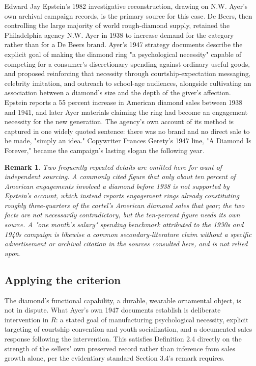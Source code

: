 \documentclass[11pt]{article}
\newtheorem{remark}[definition]{Remark}
\begin{document}
Edward Jay Epstein's 1982 investigative reconstruction, drawing on N.W. Ayer's own archival campaign records, is the primary source for this case. De Beers, then controlling the large majority of world rough-diamond supply, retained the Philadelphia agency N.W. Ayer in 1938 to increase demand for the category rather than for a De Beers brand. Ayer's 1947 strategy documents describe the explicit goal of making the diamond ring "a psychological necessity" capable of competing for a consumer's discretionary spending against ordinary useful goods, and proposed reinforcing that necessity through courtship-expectation messaging, celebrity imitation, and outreach to school-age audiences, alongside cultivating an association between a diamond's size and the depth of the giver's affection. Epstein reports a 55 percent increase in American diamond sales between 1938 and 1941, and later Ayer materials claiming the ring had become an engagement necessity for the new generation. The agency's own account of its method is captured in one widely quoted sentence: there was no brand and no direct sale to be made, "simply an idea." Copywriter Frances Gerety's 1947 line, "A Diamond Is Forever," became the campaign's lasting slogan the following year.

\begin{remark}
Two frequently repeated details are omitted here for want of independent sourcing. A commonly cited figure that only about ten percent of American engagements involved a diamond before 1938 is not supported by Epstein's account, which instead reports engagement rings already constituting roughly three-quarters of the cartel's American diamond sales that year; the two facts are not necessarily contradictory, but the ten-percent figure needs its own source. A "one month's salary" spending benchmark attributed to the 1930s and 1940s campaign is likewise a common secondary-literature claim without a specific advertisement or archival citation in the sources consulted here, and is not relied upon.
\end{remark}

\subsection{Applying the criterion}

The diamond's functional capability, a durable, wearable ornamental object, is not in dispute. What Ayer's own 1947 documents establish is deliberate intervention in $R$: a stated goal of manufacturing psychological necessity, explicit targeting of courtship convention and youth socialization, and a documented sales response following the intervention. This satisfies Definition 2.4 directly on the strength of the sellers' own preserved record rather than inference from sales growth alone, per the evidentiary standard Section 3.4's remark requires.
\end{document}
